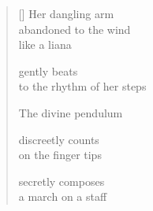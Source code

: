 \documentclass[11pt,a4paper]{article}
\begin{document}
\thispagestyle{empty}

\poemtitle{}

\settowidth{\versewidth}{up to the fluttering measure}

\bigskip

\begin{verse}[\versewidth]
  Her dangling arm \\
  abandoned to the wind \\
  like a liana

  gently beats \\
  to the rhythm of her steps

  The divine pendulum

  discreetly counts \\
  on the finger tips

  secretly composes \\
  a march on a staff
  \end{verse}
\end{document}
